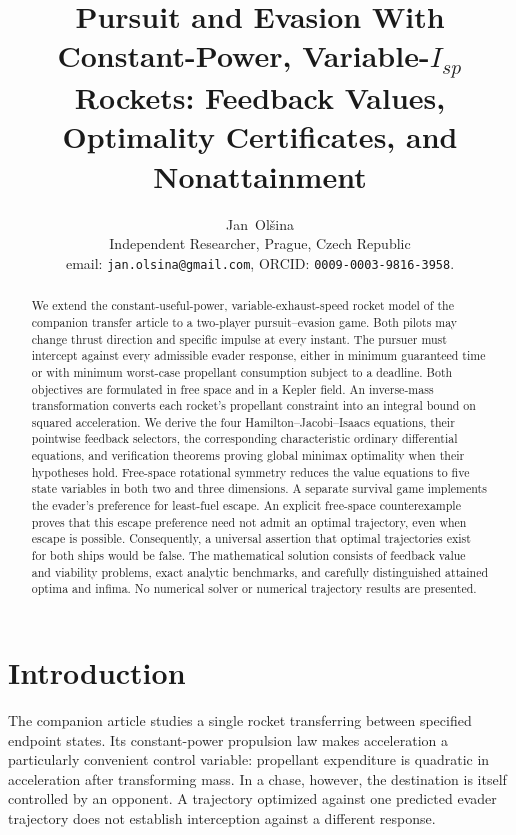 \documentclass[journal,a4paper]{IEEEtran}
\date{}
\begin{document}
\title{Pursuit and Evasion With Constant-Power, Variable-$I_{\!sp}$ Rockets: Feedback Values, Optimality Certificates, and Nonattainment}
\author{Jan~Ol\v{s}ina\\[1ex] Independent Researcher, Prague, Czech Republic\\
email: \texttt{jan.olsina@gmail.com}, ORCID: \texttt{0009-0003-9816-3958}.}
\maketitle

\begin{abstract}
We extend the constant-useful-power, variable-exhaust-speed rocket model of the companion transfer article to a two-player pursuit--evasion game. Both pilots may change thrust direction and specific impulse at every instant. The pursuer must intercept against every admissible evader response, either in minimum guaranteed time or with minimum worst-case propellant consumption subject to a deadline. Both objectives are formulated in free space and in a Kepler field. An inverse-mass transformation converts each rocket's propellant constraint into an integral bound on squared acceleration. We derive the four Hamilton--Jacobi--Isaacs equations, their pointwise feedback selectors, the corresponding characteristic ordinary differential equations, and verification theorems proving global minimax optimality when their hypotheses hold. Free-space rotational symmetry reduces the value equations to five state variables in both two and three dimensions. A separate survival game implements the evader's preference for least-fuel escape. An explicit free-space counterexample proves that this escape preference need not admit an optimal trajectory, even when escape is possible. Consequently, a universal assertion that optimal trajectories exist for both ships would be false. The mathematical solution consists of feedback value and viability problems, exact analytic benchmarks, and carefully distinguished attained optima and infima. No numerical solver or numerical trajectory results are presented.
\end{abstract}

\section{Introduction}
The companion article \cite{OlsinaCompanion} studies a single rocket transferring between specified endpoint states. Its constant-power propulsion law makes acceleration a particularly convenient control variable: propellant expenditure is quadratic in acceleration after transforming mass. In a chase, however, the destination is itself controlled by an opponent. A trajectory optimized against one predicted evader trajectory does not establish interception against a different response.
\end{document}
